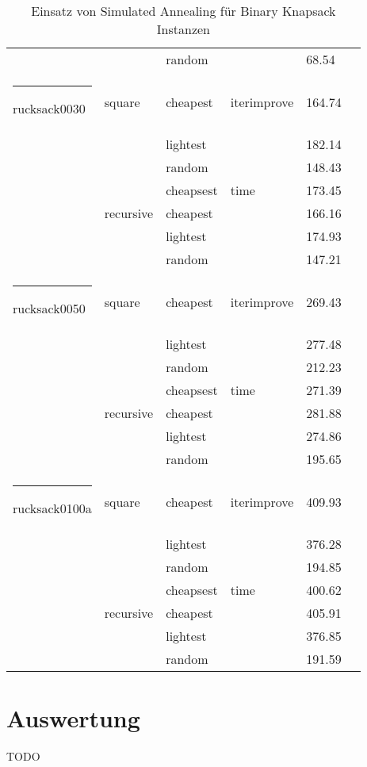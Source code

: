 \documentclass[11pt,a4paper]{article}
\makeatletter
\def\hlinewd#1{
  \noalign{\ifnum0=`}\fi\hrule \@height #1 \futurelet
  \reserved@a\@xhline
}
\makeatother
\begin{document}
\begin{table}[!t]
\begin{tabular}{ | l | l | l | l | l | l | }
            &           & random &            & 68.54 \\ \hlinewd{3pt}
        rucksack0030 & square & cheapest & iterimprove & 164.74 \\ \hline
            &        & lightest &             & \textcolor{OliveGreen}{182.14} \\ \hline
            &        & random &               & 148.43 \\ \hline
            &        & cheapsest & time       & 173.45 \\ \hline
           & recursive & cheapest &          & 166.16 \\ \hline
           &           & lightest &          & 174.93 \\ \hline
           &           & random &            & \textcolor{BrickRed}{147.21} \\ \hlinewd{3pt}
        rucksack0050 & square & cheapest & iterimprove & 269.43 \\ \hline
            &        & lightest &             & 277.48 \\ \hline
            &        & random &               & 212.23 \\ \hline
            &        & cheapsest & time       & 271.39 \\ \hline
           & recursive & cheapest &          & \textcolor{OliveGreen}{281.88} \\ \hline
           &           & lightest &          & 274.86 \\ \hline
           &           & random &            & \textcolor{BrickRed}{195.65} \\ \hlinewd{3pt}
        rucksack0100a & square & cheapest & iterimprove & \textcolor{OliveGreen}{409.93} \\ \hline
             &        & lightest &             & 376.28 \\ \hline
             &        & random &               & 194.85 \\ \hline
             &        & cheapsest & time       & 400.62 \\ \hline
             & recursive & cheapest &          & 405.91 \\ \hline
             &           & lightest &          & 376.85 \\ \hline
             &           & random &            & \textcolor{BrickRed}{191.59} \\ \hline
  \end{tabular}
    \caption{Einsatz von Simulated Annealing für Binary Knapsack Instanzen}
    \label{tab:results}
\end{table}

\section{Auswertung}

TODO
\end{document}
